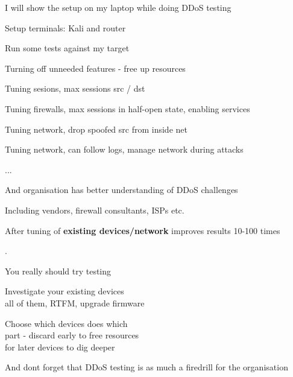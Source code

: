\documentclass[Screen16to9,17pt]{foils}
\begin{document}
\begin{list1}
\item I will show the setup on my laptop while doing DDoS testing
\item Setup terminals: Kali and router
\item Run some tests against my target
\end{list1}


\begin{list1}
\item Turning off unneeded features - free up resources
\item Tuning sesions, max sessions src / dst
\item Tuning firewalls, max sessions in half-open state, enabling services
\item Tuning network, drop spoofed src from inside net \smiley
\item Tuning network, can follow logs, manage network during attacks
\item ...
\item And organisation has better understanding of DDoS challenges
\item Including vendors, firewall consultants, ISPs etc.
\end{list1}

\vskip 1cm
\centerline{After tuning of {\bf existing devices/network} improves results 10-100 times}


.
\begin{list1}
\item You really should try testing
\item Investigate your existing devices\\
all of them, RTFM, upgrade firmware
\item Choose which devices does which\\
part - discard early to free resources\\
for later devices to dig deeper
\end{list1}

\vskip 2cm
\centerline{And dont forget that DDoS testing is as much a firedrill for the organisation}
\end{document}
